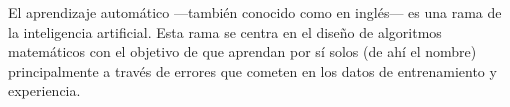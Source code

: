 El aprendizaje automático ---también conocido como  en inglés--- es una rama de la inteligencia artificial. Esta rama se centra en el diseño de algoritmos matemáticos con el objetivo de que aprendan por sí solos (de ahí el nombre) principalmente a través de errores que cometen en los datos de entrenamiento y experiencia.

